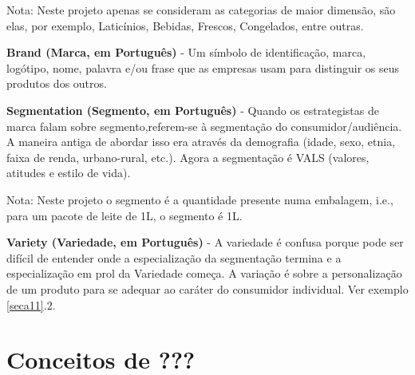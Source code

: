 {\footnotesize Nota: Neste projeto apenas se consideram as categorias de maior dimensão, são elas, por exemplo, Laticínios, Bebidas, Frescos, Congelados, entre outras.}


\vspace{0.2cm}
\textbf{Brand (Marca, em Português)} - Um símbolo de identificação, marca, logótipo, nome, palavra e/ou frase que as empresas usam para distinguir os seus produtos dos outros.


\vspace{0.2cm}
\textbf{Segmentation (Segmento, em Português)} - Quando os estrategistas de marca falam sobre segmento,referem-se à segmentação do consumidor/audiência. A maneira antiga de abordar isso era através da demografia (idade, sexo, etnia, faixa de renda, urbano-rural, etc.). Agora a segmentação é VALS (valores, atitudes e estilo de vida). 

{\footnotesize Nota: Neste projeto o segmento é a quantidade presente numa embalagem, i.e., para um pacote de leite de 1L, o segmento é 1L.}


\vspace{0.2cm}
\textbf{Variety (Variedade, em Português)} - A variedade é confusa porque pode ser difícil de entender onde a especialização da segmentação termina e a especialização em prol da Variedade começa. A variação é sobre a personalização de um produto para se adequar ao caráter do consumidor individual. Ver exemplo \ref{seca11}.2.

\vspace{0.5cm}

\noindent{}

%
%
\section{Conceitos de ???} \label{seca12}	
	
\glsaddall
\printglossary[type=\acronymtype,title=Acronyms]
